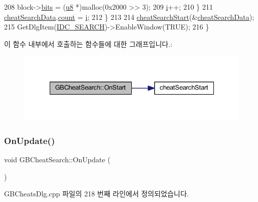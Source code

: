 \begin{DoxyCode}
208       block->\mbox{\hyperlink{struct_cheat_search_block_a59258efebf4223be206ad11d3ca8ebf4}{bits}} = (\mbox{\hyperlink{_system_8h_aed742c436da53c1080638ce6ef7d13de}{u8}} *)malloc(0x2000 >> 3);
209       \mbox{\hyperlink{expr-lex_8cpp_acb559820d9ca11295b4500f179ef6392}{i}}++;    
210     \}
211     \mbox{\hyperlink{_cheat_search_8cpp_aeeb4f5916a0f16b1bb45e57aa2cc58d4}{cheatSearchData}}.\mbox{\hyperlink{struct_cheat_search_data_a4c4d3092ddaff068d820c28067b15774}{count}} = \mbox{\hyperlink{expr-lex_8cpp_acb559820d9ca11295b4500f179ef6392}{i}};
212   \}
213 
214   \mbox{\hyperlink{_cheat_search_8cpp_a1779719e65aedd0eb19d29f7de1c1aeb}{cheatSearchStart}}(&\mbox{\hyperlink{_cheat_search_8cpp_aeeb4f5916a0f16b1bb45e57aa2cc58d4}{cheatSearchData}});
215   GetDlgItem(\mbox{\hyperlink{resource_8h_a8c4255e9c378282d679addf177c44b8f}{IDC\_SEARCH}})->EnableWindow(TRUE);
216 \}
\end{DoxyCode}
이 함수 내부에서 호출하는 함수들에 대한 그래프입니다.\+:
\nopagebreak
\begin{figure}[H]
\begin{center}
\leavevmode
\includegraphics[width=335pt]{class_g_b_cheat_search_add94032f04d4e03bee943d9a7051df20_cgraph}
\end{center}
\end{figure}
\mbox{\label{class_g_b_cheat_search_a9e91910287e7ff53576af9b32de875ad}} 
\subsubsection{\texorpdfstring{On\+Update()}{OnUpdate()}}
{\footnotesize\ttfamily void G\+B\+Cheat\+Search\+::\+On\+Update (\begin{DoxyParamCaption}{ }\end{DoxyParamCaption})\hspace{0.3cm}{\ttfamily [protected]}}



G\+B\+Cheats\+Dlg.\+cpp 파일의 218 번째 라인에서 정의되었습니다.


